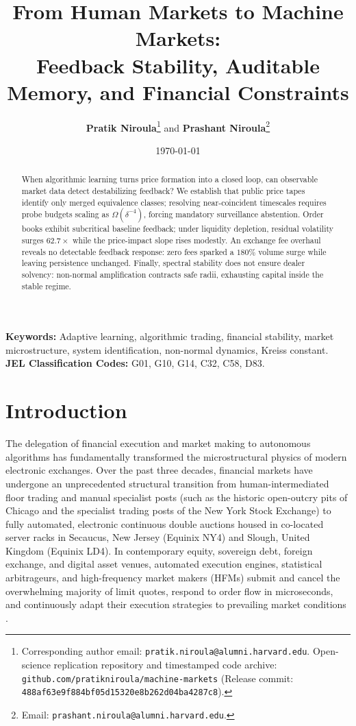 \documentclass[12pt]{article}
\title{\textbf{From Human Markets to Machine Markets:}\\[0.3em]
\Large Feedback Stability, Auditable Memory, and Financial Constraints}
\author{\textbf{Pratik Niroula}\thanks{Corresponding author email: \texttt{pratik.niroula@alumni.harvard.edu}. Open-science replication repository and timestamped code archive: \texttt{github.com/pratikniroula/machine-markets} (Release commit: \texttt{488af63e9f884bf05d15320e8b262d04ba4287c8}).} \quad and \quad \textbf{Prashant Niroula}\thanks{Email: \texttt{prashant.niroula@alumni.harvard.edu}.}}
\date{\today}
\theoremstyle{definition}
\theoremstyle{remark}
\begin{document}
\maketitle
\thispagestyle{empty}

\vspace{-0.5em}
\begin{abstract}
\noindent When algorithmic learning turns price formation into a closed loop, can observable market data detect destabilizing feedback? We establish that public price tapes identify only merged equivalence classes; resolving near-coincident timescales requires probe budgets scaling as $\Omega(\delta^{-4})$, forcing mandatory surveillance abstention. Order books exhibit subcritical baseline feedback; under liquidity depletion, residual volatility surges $62.7\times$ while the price-impact slope rises modestly. An exchange fee overhaul reveals no detectable feedback response: zero fees sparked a $180\%$ volume surge while leaving persistence unchanged. Finally, spectral stability does not ensure dealer solvency: non-normal amplification contracts safe radii, exhausting capital inside the stable regime.
\end{abstract}

\vspace{1.0em}
\noindent\textbf{Keywords:} Adaptive learning, algorithmic trading, financial stability, market microstructure, system identification, non-normal dynamics, Kreiss constant.\\
\textbf{JEL Classification Codes:} G01, G10, G14, C32, C58, D83.

\newpage
\setcounter{page}{1}

\section{Introduction}
\label{sec:intro}

The delegation of financial execution and market making to autonomous algorithms has fundamentally transformed the microstructural physics of modern electronic exchanges. Over the past three decades, financial markets have undergone an unprecedented structural transition from human-intermediated floor trading and manual specialist posts (such as the historic open-outcry pits of Chicago and the specialist trading posts of the New York Stock Exchange) to fully automated, electronic continuous double auctions housed in co-located server racks in Secaucus, New Jersey (Equinix NY4) and Slough, United Kingdom (Equinix LD4). In contemporary equity, sovereign debt, foreign exchange, and digital asset venues, automated execution engines, statistical arbitrageurs, and high-frequency market makers (HFMs) submit and cancel the overwhelming majority of limit quotes, respond to order flow in microseconds, and continuously adapt their execution strategies to prevailing market conditions \citep{hasbrouck1991,menkveld2013,budish2015,biais2015}.
\end{document}
